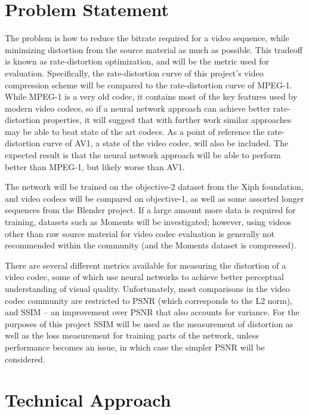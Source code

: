 \documentclass[10pt,twocolumn,letterpaper]{article}
\begin{document}

\section{Problem Statement}

The problem is how to reduce the bitrate required for a video sequence, while minimizing distortion from the source material as much as possible. This tradeoff is known as rate-distortion optimization, and will be the metric used for evaluation. Specifically, the rate-distortion curve of this project's video compression scheme will be compared to the rate-distortion curve of MPEG-1. While MPEG-1 is a very old codec, it contains most of the key features used by modern video codecs, so if a neural network approach can achieve better rate-distortion properties, it will suggest that with further work similar approaches may be able to beat state of the art codecs. As a point of reference the rate-distortion curve of AV1, a state of the video codec, will also be included. The expected result is that the neural network approach will be able to perform better than MPEG-1, but likely worse than AV1.

The network will be trained on the objective-2 dataset from the Xiph foundation, and video codecs will be compared on objective-1, as well as some assorted longer sequences from the Blender project. If a large amount more data is required for training, datasets such as Moments will be investigated; however, using videos other than raw source material for video codec evaluation is generally not recommended within the community (and the Moments dataset is compressed).

There are several different metrics available for measuring the distortion of a video codec, some of which use neural networks to achieve better perceptual understanding of visual quality. Unfortunately, most comparisons in the video codec community are restricted to PSNR (which corresponds to the L2 norm), and SSIM -- an improvement over PSNR that also accounts for variance. For the purposes of this project SSIM will be used as the measurement of distortion as well as the loss measurement for training parts of the network, unless performance becomes an issue, in which case the simpler PSNR will be considered.

\section{Technical Approach}
\end{document}
